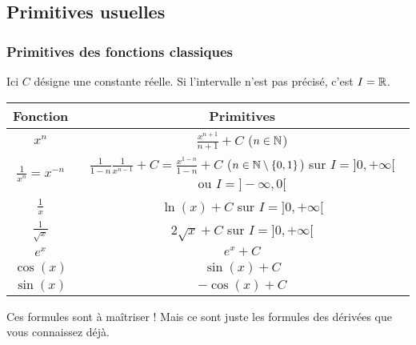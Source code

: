 \documentclass[11pt,class=report,crop=false]{standalone}
\begin{document}
\subsection*{Primitives usuelles}


\subsubsection*{Primitives des fonctions classiques}

Ici $C$ désigne une constante réelle.
Si l'intervalle n'est pas précisé, c'est $I=\mathbb{R}$.

\begin{center}
	\begin{tabular}[t]{|c|c@{\vrule depth 1.2ex height 3ex width 0mm \ }|}
		\hline
		\textbf{Fonction}         & \textbf{Primitives} \\ \hline
		$x^n$          & $\frac{x^{n+1}}{n+1}+C$  \quad ($n \in \mathbb{N}$)   \\ \hline
		$\frac{1}{x^n} = x^{-n}$         & $\frac{1}{1-n}\frac1{x^{n-1}}+C=\frac{x^{1-n}}{1-n}+C$  \quad ($n \in \mathbb{N}\setminus\{0,1\}$) \quad sur $I=]0,+\infty[$  ou $I=]-\infty,0[$   \\ \hline
		$\frac{1}{x}$  & $\ln(x)+C$ \quad sur $I=]0,+\infty[$              \\ \hline
		$\frac{1}{\sqrt x}$  & $2\sqrt{x}+C$ \quad sur $I=]0,+\infty[$              \\ \hline
		$e^x$          & $e^x+C$                        \\ \hline
		$\cos(x)$      & $\sin(x)+C$                \\ \hline
		$\sin(x)$      & $-\cos(x)+C$                     \\ \hline
	\end{tabular}
\end{center}

Ces formules sont à maîtriser ! Mais ce sont juste les formules des dérivées que vous connaissez déjà.
\end{document}
